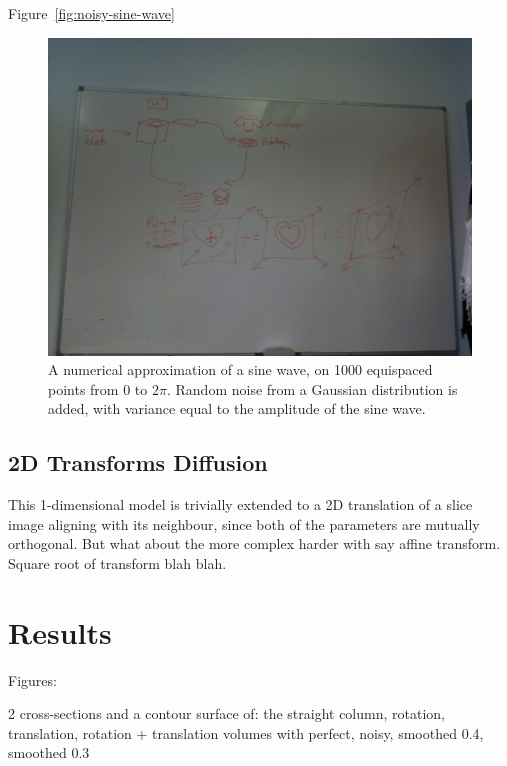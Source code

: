       Figure~\ref{fig:noisy-sine-wave}
      \begin{figure}[htbp]
        \centering
        \includegraphics[height=0.7\textwidth]{Ch6/Figs/process_diagram}
        \caption{A numerical approximation of a sine wave, on 1000 equispaced points from $0$ to $2\pi$. Random noise from a Gaussian distribution is added, with variance equal to the amplitude of the sine wave.}
      \end{figure}
    
  \subsection{2D Transforms Diffusion} %
  \label{sub:2d_transforms_diffusion}
    This 1-dimensional model is trivially extended to a 2D translation of a slice image aligning with its neighbour, since both of the parameters are mutually orthogonal. But what about the more complex harder with say affine transform. Square root of transform blah blah.
  
  

\section{Results} %
\label{sec:results}
  
  Figures:
  
  2 cross-sections and a contour surface of:
    the straight column, rotation, translation, rotation + translation volumes
      with perfect, noisy, smoothed 0.4, smoothed 0.3
        
